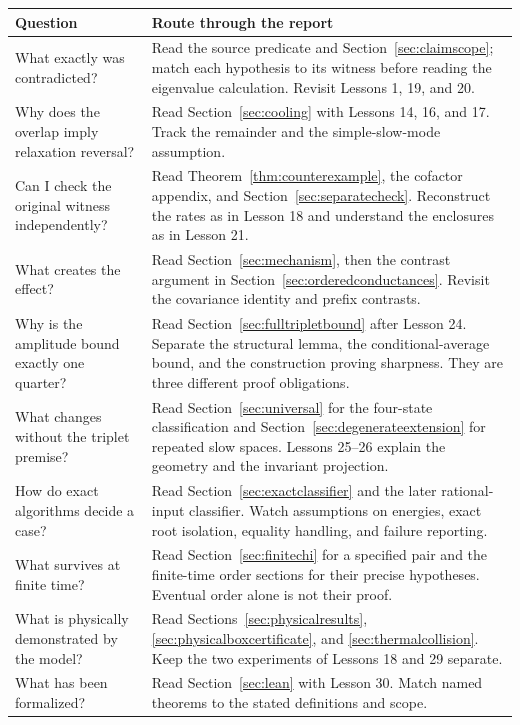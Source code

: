 \documentclass[11pt]{article}
\begin{document}
\begin{longtable}{>{\raggedright\arraybackslash}p{}>{\raggedright\arraybackslash}p{}}
\toprule Question & Route through the report\\\midrule
\endhead
What exactly was contradicted? & Read the source predicate and
Section~\ref{sec:claimscope}; match each hypothesis to its witness before
reading the eigenvalue calculation. Revisit Lessons 1, 19, and 20.\\[5pt]
Why does the overlap imply relaxation reversal? & Read
Section~\ref{sec:cooling} with Lessons 14, 16, and 17. Track the remainder
and the simple-slow-mode assumption.\\[5pt]
Can I check the original witness independently? & Read
Theorem~\ref{thm:counterexample}, the cofactor appendix, and
Section~\ref{sec:separatecheck}. Reconstruct the rates as in Lesson 18 and
understand the enclosures as in Lesson 21.\\[5pt]
What creates the effect? & Read Section~\ref{sec:mechanism}, then the
contrast argument in Section~\ref{sec:orderedconductances}. Revisit the
covariance identity and prefix contrasts.\\[5pt]
Why is the amplitude bound exactly one quarter? & Read
Section~\ref{sec:fulltripletbound} after Lesson 24. Separate the structural
lemma, the conditional-average bound, and the construction proving
sharpness. They are three different proof obligations.\\[5pt]
What changes without the triplet premise? & Read
Section~\ref{sec:universal} for the four-state classification and
Section~\ref{sec:degenerateextension} for repeated slow spaces.
Lessons 25--26 explain the geometry and the invariant projection.\\[5pt]
How do exact algorithms decide a case? & Read
Section~\ref{sec:exactclassifier} and the later rational-input classifier.
Watch assumptions on energies, exact root isolation, equality handling,
and failure reporting.\\[5pt]
What survives at finite time? & Read Section~\ref{sec:finitechi} for a
specified pair and the finite-time order sections for their precise
hypotheses. Eventual order alone is not their proof.\\[5pt]
What is physically demonstrated by the model? & Read
Sections~\ref{sec:physicalresults}, \ref{sec:physicalboxcertificate}, and
\ref{sec:thermalcollision}. Keep the two experiments of Lessons 18 and
29 separate.\\[5pt]
What has been formalized? & Read Section~\ref{sec:lean} with Lesson 30.
Match named theorems to the stated definitions and scope.\\
\bottomrule
\end{longtable}
\end{document}
